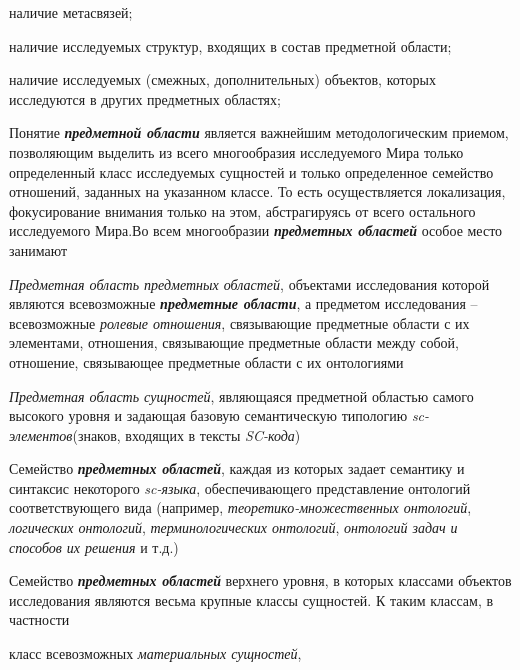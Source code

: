 \begin{SCn}
\begin{scnsubstruct}
\begin{scnsubstruct}
{                \begin{scnitemize}
                    \item наличие метасвязей;
                    \item наличие исследуемых структур, входящих в состав предметной области;
                    \item наличие исследуемых (смежных, дополнительных) объектов, которых исследуются в других предметных областях;
                \end{scnitemize}
                Понятие \textbf{\textit{предметной области}} является важнейшим методологическим приемом, позволяющим выделить из всего многообразия исследуемого Мира только определенный класс исследуемых сущностей и только определенное семейство отношений, заданных на указанном классе. То есть осуществляется локализация, фокусирование внимания только на этом, абстрагируясь от всего остального исследуемого Мира.Во всем многообразии \textbf{\textit{предметных областей}} особое место занимают
                \begin{scnitemize}
                    \item \textit{Предметная область предметных областей}, объектами исследования которой являются всевозможные \textbf{\textit{предметные области}}, а предметом исследования -- всевозможные \textit{ролевые отношения}, связывающие предметные области с их элементами, отношения, связывающие предметные области между собой, отношение, связывающее предметные области с их онтологиями
                    \item \textit{Предметная область сущностей}, являющаяся предметной областью самого высокого уровня и задающая базовую семантическую типологию \textit{sc-элементов}(знаков, входящих в тексты \textit{SC-кода})
                    \item Семейство \textbf{\textit{предметных областей}}, каждая из которых задает семантику и синтаксис некоторого \textit{sc-языка}, обеспечивающего представление онтологий соответствующего вида (например, \textit{теоретико-множественных онтологий}, \textit{логических онтологий}, \textit{терминологических онтологий}, \textit{онтологий задач и способов их решения} и т.д.)
                    \item Семейство \textbf{\textit{предметных областей}} верхнего уровня, в которых классами объектов исследования являются весьма крупные классы сущностей. К таким классам, в частности
                    \begin{scnitemizeii}
                        \item класс всевозможных \textit{материальных сущностей},

\end{scnitemizeii}
\end{scnitemize}}
\end{scnsubstruct}
\end{scnsubstruct}
\end{SCn}
